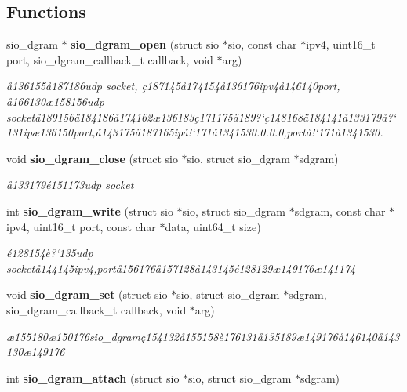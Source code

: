 \subsection*{Functions}
\begin{CompactItemize}
\item 
sio\_\-dgram $\ast$ {\bf sio\_\-dgram\_\-open} (struct sio $\ast$sio, const char $\ast$ipv4, uint16\_\-t port, sio\_\-dgram\_\-callback\_\-t callback, void $\ast$arg)
\begin{CompactList}\small\item\em \aa{}136155\aa{}187186udp socket, \c{c}187145\aa{}174154\aa{}136176ipv4\aa{}146140port, \aa{}166130\ae{}158156udp socket\"{a}189156\"{a}184186\aa{}174162\ae{}136183\c{c}171175\"{a}189?`\c{c}148168\"{a}184141\aa{}133179\aa{}?`131ip\ae{}136150port,\aa{}143175\"{a}187165ip\aa{}!`171\aa{}1341530.0.0.0,port\aa{}!`171\aa{}1341530. \item\end{CompactList}\item 
void {\bf sio\_\-dgram\_\-close} (struct sio $\ast$sio, struct sio\_\-dgram $\ast$sdgram)
\begin{CompactList}\small\item\em \aa{}133179\'{e}151173udp socket \item\end{CompactList}\item 
int {\bf sio\_\-dgram\_\-write} (struct sio $\ast$sio, struct sio\_\-dgram $\ast$sdgram, const char $\ast$ipv4, uint16\_\-t port, const char $\ast$data, uint64\_\-t size)
\begin{CompactList}\small\item\em \'{e}128154\`{e}?`135udp socket\aa{}144145ipv4,port\aa{}156176\aa{}157128\aa{}143145\'{e}128129\ae{}149176\ae{}141174 \item\end{CompactList}\item 
void {\bf sio\_\-dgram\_\-set} (struct sio $\ast$sio, struct sio\_\-dgram $\ast$sdgram, sio\_\-dgram\_\-callback\_\-t callback, void $\ast$arg)
\begin{CompactList}\small\item\em \ae{}155180\ae{}150176sio\_\-dgram\c{c}154132\aa{}155158\`{e}176131\aa{}135189\ae{}149176\aa{}146140\aa{}143130\ae{}149176 \item\end{CompactList}\item 
int {\bf sio\_\-dgram\_\-attach} (struct sio $\ast$sio, struct sio\_\-dgram $\ast$sdgram)

\end{CompactItemize}
